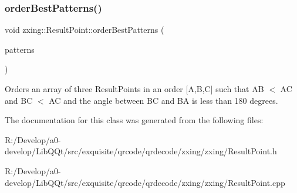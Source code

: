\subsubsection{\texorpdfstring{order\+Best\+Patterns()}{orderBestPatterns()}}
{\footnotesize\ttfamily void zxing\+::\+Result\+Point\+::order\+Best\+Patterns (\begin{DoxyParamCaption}\item[{std\+::vector$<$ \mbox{\hyperlink{classzxing_1_1_ref}{Ref}}$<$ \mbox{\hyperlink{classzxing_1_1_result_point}{Result\+Point}} $>$ $>$ \&}]{patterns }\end{DoxyParamCaption})\hspace{0.3cm}{\ttfamily [static]}}

Orders an array of three Result\+Points in an order \mbox{[}A,B,C\mbox{]} such that AB $<$ AC and BC $<$ AC and the angle between BC and BA is less than 180 degrees. 

The documentation for this class was generated from the following files\+:\begin{DoxyCompactItemize}
\item 
R\+:/\+Develop/a0-\/develop/\+Lib\+Q\+Qt/src/exquisite/qrcode/qrdecode/zxing/zxing/Result\+Point.\+h\item 
R\+:/\+Develop/a0-\/develop/\+Lib\+Q\+Qt/src/exquisite/qrcode/qrdecode/zxing/zxing/Result\+Point.\+cpp\end{DoxyCompactItemize}
